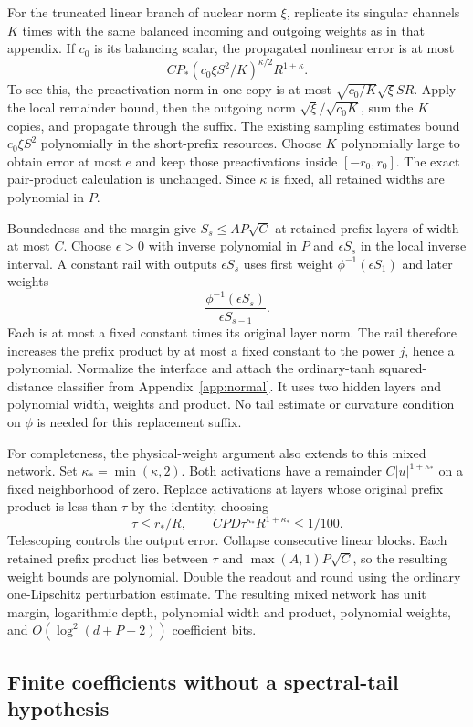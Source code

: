 For the truncated linear branch of nuclear norm $\xi$, replicate
its singular channels $K$ times with the same balanced incoming and
outgoing weights as in that appendix. If $c_0$ is its balancing
scalar, the propagated nonlinear error is at most
\[
 CP_* (c_0\xi S^2/K)^{\kappa/2}R^{1+\kappa}.
\]
To see this, the preactivation norm in one copy is at most
$\sqrt{c_0/K}\sqrt\xi SR$. Apply the local remainder bound,
then the outgoing norm $\sqrt\xi/\sqrt{c_0K}$, sum the $K$
copies, and propagate through the suffix. The existing sampling
estimates bound $c_0\xi S^2$ polynomially in the short-prefix
resources. Choose $K$ polynomially large to obtain error at most
$e$ and keep those preactivations inside $[-r_0,r_0]$.
The exact pair-product calculation is unchanged. Since $\kappa$
is fixed, all retained widths are polynomial in $P$.

Boundedness and the margin give $S_s\le AP\sqrt C$ at retained
prefix layers of width at most $C$. Choose $\epsilon>0$ with inverse
polynomial in $P$ and $\epsilon S_s$ in the local inverse interval.
A constant rail with outputs $\epsilon S_s$ uses first weight
$\phi^{-1}(\epsilon S_1)$ and later weights
\[
 \frac{\phi^{-1}(\epsilon S_s)}{\epsilon S_{s-1}}.
\]
Each is at most a fixed constant times its original layer norm.
The rail therefore increases the prefix product by at most a fixed
constant to the power $j$, hence a polynomial. Normalize the
interface and attach the ordinary-tanh squared-distance classifier
from Appendix~\ref{app:normal}. It uses two hidden layers and
polynomial width, weights and product. No tail estimate or curvature
condition on $\phi$ is needed for this replacement suffix.

For completeness, the physical-weight argument also extends to this
mixed network. Set $\kappa_* =\min(\kappa,2)$. Both activations
have a remainder $C|u|^{1+\kappa_*}$ on a fixed neighborhood of zero.
Replace activations at layers whose original prefix product is less
than $\tau$ by the identity, choosing
\[
 \tau\le r_*/R,\qquad
 CPD\tau^{\kappa_*}R^{1+\kappa_*}\le1/100.
\]
Telescoping controls the output error. Collapse consecutive linear
blocks. Each retained prefix product lies between $\tau$ and
$\max(A,1)P\sqrt C$, so the resulting weight bounds are polynomial.
Double the readout and round using the ordinary one-Lipschitz
perturbation estimate. The resulting mixed network has unit margin,
logarithmic depth, polynomial width and product, polynomial weights,
and $O(\log^2(d+P+2))$ coefficient bits.

\subsection{Finite coefficients without a spectral-tail hypothesis}

